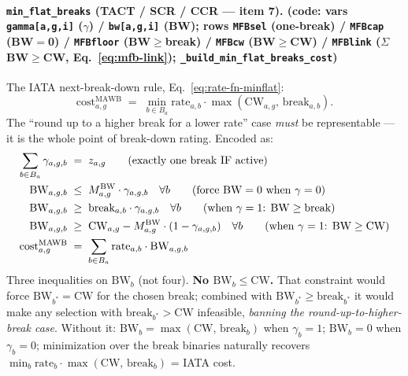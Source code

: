 \documentclass[11pt,a4paper]{article}
\theoremstyle{definition}
\begin{document}
\paragraph{\texttt{min\_flat\_breaks} (TACT / SCR / CCR --- item 7). {\normalfont(code: vars \texttt{gamma[a,g,i]} ($\gamma$) / \texttt{bw[a,g,i]} (BW); rows \texttt{MFBsel} (one-break) / \texttt{MFBcap} (BW$=$0) / \texttt{MFBfloor} (BW$\geq$break) / \texttt{MFBcw} (BW$\geq$CW) / \texttt{MFBlink} ($\Sigma$BW$\geq$CW, Eq.~\ref{eq:mfb-link}); \texttt{\_build\_min\_flat\_breaks\_cost})}}
The IATA next-break-down rule, Eq.~\ref{eq:rate-fn-minflat}:
\begin{equation}
  \text{cost}^{\text{MAWB}}_{a,g} \;=\; \min_{b \in B_a} \text{rate}_{a,b} \cdot \max(\text{CW}_{a,g},\, \text{break}_{a,b}).
  \label{eq:rate-fn-minflat}
\end{equation}
The ``round up to a higher break for a lower rate'' case \emph{must} be
representable --- it is the whole point of break-down rating. Encoded as:
\begin{align}
  \sum_{b \in B_a} \gamma_{a,g,b} \;&=\; z_{a,g}
    \tag{exactly one break IF active} \\
  \text{BW}_{a,g,b} \;&\leq\; M^{\text{BW}}_{a,g} \cdot \gamma_{a,g,b}
    \quad \forall b \tag{force $\text{BW} = 0$ when $\gamma = 0$} \\
  \text{BW}_{a,g,b} \;&\geq\; \text{break}_{a,b} \cdot \gamma_{a,g,b}
    \quad \forall b \tag{when $\gamma = 1$: $\text{BW} \geq \text{break}$} \\
  \text{BW}_{a,g,b} \;&\geq\; \text{CW}_{a,g} - M^{\text{BW}}_{a,g} \cdot (1 - \gamma_{a,g,b})
    \quad \forall b \tag{when $\gamma = 1$: $\text{BW} \geq \text{CW}$} \\
  \text{cost}^{\text{MAWB}}_{a,g} \;&=\; \sum_{b \in B_a} \text{rate}_{a,b} \cdot \text{BW}_{a,g,b}
\end{align}
Three inequalities on $\text{BW}_b$ (not four). \textbf{No $\text{BW}_b \leq
\text{CW}$.} That constraint would force $\text{BW}_{b^*} = \text{CW}$ for
the chosen break; combined with $\text{BW}_{b^*} \geq \text{break}_{b^*}$ it
would make any selection with $\text{break}_{b^*} > \text{CW}$ infeasible,
\emph{banning the round-up-to-higher-break case}. Without it: $\text{BW}_b =
\max(\text{CW},\, \text{break}_b)$ when $\gamma_b = 1$; $\text{BW}_b = 0$
when $\gamma_b = 0$; minimization over the break binaries naturally recovers
$\min_b \text{rate}_b \cdot \max(\text{CW},\, \text{break}_b)$ = IATA cost.
\end{document}
